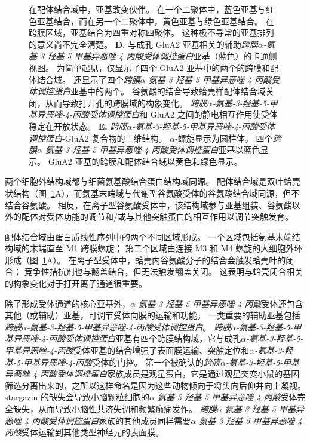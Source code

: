 \begin{figure}[htbp]
{		在配体结合域中，亚基改变伙伴。
		在一个二聚体中，蓝色亚基与红色亚基结合，而在另一个二聚体中，黄色亚基与绿色亚基结合。
		在跨膜区域，亚基结合为四重对称四聚体。
		这种极不寻常的亚基排列的意义尚不完全清楚\cite{sobolevsky2009x}。
		\textbf{D.} 与成孔 GluA2 亚基相关的辅助\textit{跨膜$\alpha$-氨基-3-羟基-5-甲基异恶唑-4-丙酸受体调控蛋白}亚基（蓝色）的卡通侧视图。
		为简单起见，仅显示了四个 GluA2 亚基中的两个的跨膜和配体结合域。
		还显示了四个\textit{跨膜$\alpha$-氨基-3-羟基-5-甲基异恶唑-4-丙酸受体调控蛋白}亚基中的两个。
		谷氨酸的结合导致蛤壳样配体结合域关闭，从而导致打开孔的跨膜域的构象变化。
		\textit{跨膜$\alpha$-氨基-3-羟基-5-甲基异恶唑-4-丙酸受体调控蛋白}和 GluA2 之间的静电相互作用使受体稳定在开放状态\cite{mayer2016structural}。 
		\textbf{E.} \textit{跨膜$\alpha$-氨基-3-羟基-5-甲基异恶唑-4-丙酸受体调控蛋白}-GluA2 复合物的三维结构。
		$\alpha$-螺旋显示为圆柱体。
		四个\textit{跨膜$\alpha$-氨基-3-羟基-5-甲基异恶唑-4-丙酸受体调控蛋白}亚基以蓝色显示。
		GluA2 亚基的跨膜和配体结合域以黄色和绿色显示\cite{mayer2016structural}。}
	\label{fig:13_5}
\end{figure}


两个细胞外结构域都与细菌氨基酸结合蛋白结构域同源。
配体结合域是双叶蛤壳状结构（图~\ref{fig:13_5}A），而氨基末端域与代谢型谷氨酸受体的谷氨酸结合域同源，但不结合谷氨酸。
相反，在离子型谷氨酸受体中，该结构域参与亚基组装、谷氨酸以外的配体对受体功能的调节和/或与其他突触蛋白的相互作用以调节突触发育。


配体结合域由蛋白质线性序列中的两个不同区域形成。
一个区域包括氨基末端结构域的末端直至 M1 跨膜螺旋；
第二个区域由连接 M3 和 M4 螺旋的大细胞外环形成（图~\ref{fig:13_5}A）。
在离子型受体中，蛤壳内谷氨酸分子的结合会触发蛤壳叶的闭合；
竞争性拮抗剂也与翻盖结合，但无法触发翻盖关闭。
这表明与蛤壳闭合相关的构象变化对于打开离子通道很重要。


除了形成受体通道的核心亚基外，\textit{$\alpha$-氨基-3-羟基-5-甲基异恶唑-4-丙酸}受体还包含其他（或辅助）亚基，可调节受体向膜的运输和功能。
一类重要的辅助亚基包括\textit{跨膜$\alpha$-氨基-3-羟基-5-甲基异恶唑-4-丙酸受体调控蛋白}。
\textit{跨膜$\alpha$-氨基-3-羟基-5-甲基异恶唑-4-丙酸受体调控蛋白}亚基有四个跨膜结构域，它与成孔\textit{$\alpha$-氨基-3-羟基-5-甲基异恶唑-4-丙酸}受体亚基的结合增强了表面膜运输、突触定位和\textit{$\alpha$-氨基-3-羟基-5-甲基异恶唑-4-丙酸}受体的门控。
第一个被确认的\textit{跨膜$\alpha$-氨基-3-羟基-5-甲基异恶唑-4-丙酸受体调控蛋白}家族成员是观星蛋白，它是通过观星突变小鼠的基因筛选分离出来的，之所以这样命名是因为这些动物倾向于将头向后仰并向上凝视。
stargazin 的缺失会导致小脑颗粒细胞的\textit{$\alpha$-氨基-3-羟基-5-甲基异恶唑-4-丙酸}受体完全缺失，从而导致小脑性共济失调和频繁癫痫发作。
\textit{跨膜$\alpha$-氨基-3-羟基-5-甲基异恶唑-4-丙酸受体调控蛋白}家族的其他成员同样需要\textit{$\alpha$-氨基-3-羟基-5-甲基异恶唑-4-丙酸}受体运输到其他类型神经元的表面膜。


